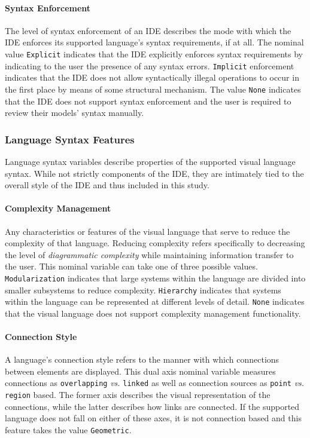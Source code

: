 \paragraph{Syntax Enforcement} The level of syntax enforcement of an IDE
describes the mode with which the IDE enforces its supported language's
syntax requirements, if at all. The nominal value \texttt{Explicit}
indicates that the IDE explicitly enforces syntax requirements by
indicating to the user the presence of any syntax errors. \texttt{Implicit}
enforcement indicates that the IDE does not allow syntactically illegal
operations to occur in the first place by means of some structural
mechanism. The value \texttt{None} indicates that the IDE does not support
syntax enforcement and the user is required to review their models' syntax
manually.


\subsubsection{Language Syntax Features} \label{subsubsec:languagesyntax}

Language syntax variables describe properties of the supported visual
language syntax. While not strictly components of the IDE, they are
intimately tied to the overall style of the IDE and thus included in this
study.


\paragraph{Complexity Management} Any characteristics or features of the
visual language that serve to reduce the complexity of that language.
Reducing complexity refers specifically to decreasing the level of
\emph{diagrammatic complexity} while maintaining information transfer to
the user. \cite{moody2009} This nominal variable can take one of three
possible values. \texttt{Modularization} indicates that large systems
within the language are divided into smaller subsystems to reduce
complexity. \cite{moody2009} \texttt{Hierarchy} indicates that systems
within the language can be represented at different levels of detail.
\cite{moody2009} \texttt{None} indicates that the visual language does not
support complexity management functionality.


\paragraph{Connection Style} A language's connection style refers to the
manner with which connections between elements are displayed. This dual
axis nominal variable measures connections as \texttt{overlapping}
\emph{vs.} \texttt{linked} as well as connection sources as \texttt{point}
\emph{vs.} \texttt{region} based.  \cite{costagliola2002} The former axis
describes the visual representation of the connections, while the latter
describes how links are connected. If the supported language does not fall
on either of these axes, it is not connection based \cite{costagliola2002}
and this feature takes the value \texttt{Geometric}.


